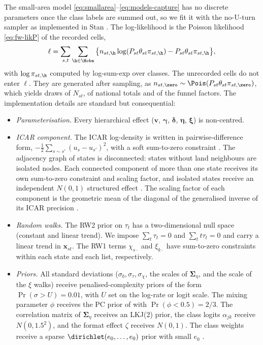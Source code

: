 The small-area model \eqref{eq:smallarea}--\eqref{eq:models-capture} has no discrete parameters once the class labels are summed out, so we fit it with the no-U-turn sampler \citep{hoffman2014} as implemented in Stan \citep{carpenter2017}. The log-likelihood is the Poisson likelihood \eqref{eq:fw-likP} of the recorded cells,
\[
  \ell=\sum_{s,t}\sum_{\h\in\Hobs}\big\{n_{st,\h}\log(P_{st}\theta_{st}\pi_{st,\h})-P_{st}\theta_{st}\pi_{st,\h}\big\},
\]
with $\log\pi_{st,\h}$ computed by log-sum-exp over classes. The unrecorded cells do not enter $\ell$. They are generated after sampling, as $n_{st,\zero}\sim\Pois(P_{st}\theta_{st}\pi_{st,\zero})$, which yields draws of $N_{st}$, of national totals and of the funnel factors. The implementation details are standard but consequential:
\begin{itemize}
  \item \emph{Parameterisation.} Every hierarchical effect ($\bm v$, $\bm\gamma$, $\bm\delta$, $\bm\eta$, $\bm\xi$) is non-centred.
  \item \emph{ICAR component.} The ICAR log-density is written in pairwise-difference form, $-\tfrac12\sum_{s\sim s'}(u_s-u_{s'})^2$, with a soft sum-to-zero constraint \citep{morris2019}. The adjacency graph of states is disconnected: states without land neighbours are isolated nodes. Each connected component of more than one state receives its own sum-to-zero constraint and scaling factor, and isolated states receive an independent $N(0,1)$ structured effect \citep{freni2018}. The scaling factor of each component is the geometric mean of the diagonal of the generalised inverse of its ICAR precision \citep{sorbye2014,riebler2016}.
  \item \emph{Random walks.} The RW2 prior on $\tau_t$ has a two-dimensional null space (constant and linear trend). We impose $\sum_t\tau_t=0$ and $\sum_tt\tau_t=0$ and carry a linear trend in $\bm x_{st}$. The RW1 terms $\chi_{s\cdot}$ and $\xi_{k\cdot}$ have sum-to-zero constraints within each state and each list, respectively.
  \item \emph{Priors.} All standard deviations ($\sigma_b,\sigma_\tau,\sigma_\chi$, the scales of $\bm\Sigma_\eta$, and the scale of the $\xi$ walks) receive penalised-complexity priors \citep{simpson2017} of the form $\Pr(\sigma>U)=0.01$, with $U$ set on the log-rate or logit scale. The mixing parameter $\phi$ receives the PC prior of \citet{riebler2016} with $\Pr(\phi<0.5)=2/3$. The correlation matrix of $\bm\Sigma_\eta$ receives an LKJ(2) prior, the class logits $\alpha_{jk}$ receive $N(0,1.5^2)$, and the format effect $\zeta$ receives $N(0,1)$. The class weights receive a sparse $\dirichlet(e_0,\dots,e_0)$ prior with small $e_0$ \citep{rousseau2011}.

\end{itemize}
